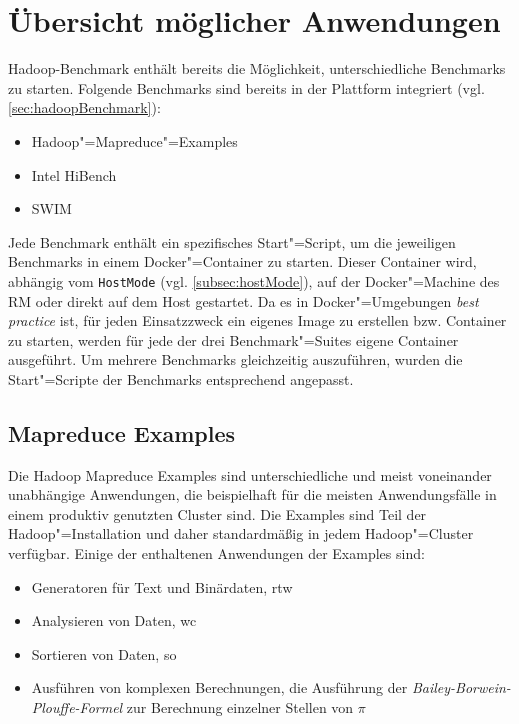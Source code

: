 \section{Übersicht möglicher Anwendungen}
\label{sec:appOverview}

Hadoop-Benchmark enthält bereits die Möglichkeit, unterschiedliche Benchmarks zu starten.
Folgende Benchmarks sind bereits in der Plattform integriert (vgl. \cref{sec:hadoopBenchmark}):

\begin{itemize}
    \item Hadoop"=Mapreduce"=Examples
    \item Intel HiBench
    \item \acrfull{SWIM}
\end{itemize}

Jede Benchmark enthält ein spezifisches Start"=Script, um die jeweiligen Benchmarks in einem Docker"=Container zu starten.
Dieser Container wird, abhängig vom \texttt{HostMode} (vgl. \cref{subsec:hostMode}), auf der Docker"=Machine des \gls{RM} oder direkt auf dem Host gestartet.
Da es in Docker"=Umgebungen \textit{best practice} ist, für jeden Einsatzzweck ein eigenes Image zu erstellen bzw. Container zu starten, werden für jede der drei Benchmark"=Suites eigene Container ausgeführt.
Um mehrere Benchmarks gleichzeitig auszuführen, wurden die Start"=Scripte der Benchmarks entsprechend angepasst.

\subsection{Mapreduce Examples}
\label{subsec:mapreduceExamples}

Die Hadoop Mapreduce Examples sind unterschiedliche und meist voneinander unabhängige Anwendungen, die beispielhaft für die meisten Anwendungsfälle in einem produktiv genutzten Cluster sind.
Die Examples sind Teil der Hadoop"=Installation und daher standardmäßig in jedem Hadoop"=Cluster verfügbar.
Einige der enthaltenen Anwendungen der Examples sind:

\begin{itemize}
    \item Generatoren für Text und Binärdaten, \zB \acrlong{rtw}
    \item Analysieren von Daten, \zB \acrlong{wc}
    \item Sortieren von Daten, \zB \acrlong{so}
    \item Ausführen von komplexen Berechnungen, \zB die Ausführung der \emph{Bailey-Borwein-Plouffe-Formel} \cite{Bailey1997} zur Berechnung einzelner Stellen von $\pi$
\end{itemize}

